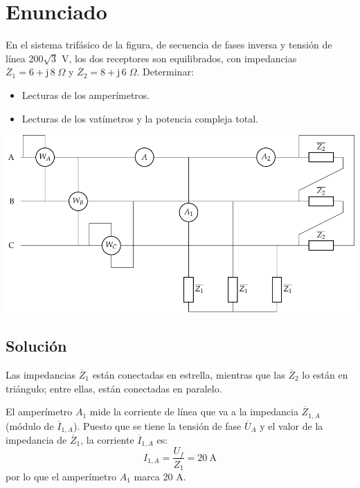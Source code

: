 
\section{Enunciado}
 
En el sistema trifásico de la figura, de secuencia de fases inversa y tensión de línea 200$\sqrt{3}$ V, los dos receptores son equilibrados, con impedancias $\overline{Z}_1 = 6+\mathrm{j}\,8\;\Omega$ y $\overline{Z}_2 = 8+\mathrm{j}\,6\;\Omega$. Determinar:
\begin{itemize}
    \item  Lecturas de los amperímetros.
    \item  Lecturas de los vatímetros y la potencia compleja total.
\end{itemize}
\begin{center}
  \includegraphics[width=.85\linewidth]{figuras/ej5_BT3.pdf}
\end{center}

\subsection*{Solución}
Las impedancias $\overline{Z}_1$ están conectadas en estrella, mientras que las $\overline{Z}_2$ lo están en triángulo; entre ellas, están conectadas en paralelo. 

\vspace{3mm}
El amperímetro $A_1$ mide la corriente de línea que va a la impedancia $\overline{Z}_{1,A}$ (módulo de $\overline{I}_{1,A}$). Puesto que se tiene la tensión de fase $\overline{U}_{A}$ y el valor de la impedancia de $\overline{Z}_1$, la corriente $\overline{I}_{1,A}$ es:
\begin{equation*}
    I_{1,A} = \frac{U_f}{Z_1} = \qty{20}{\ampere}
\end{equation*}
por lo que el amperímetro $A_1$ marca 20 A. 

